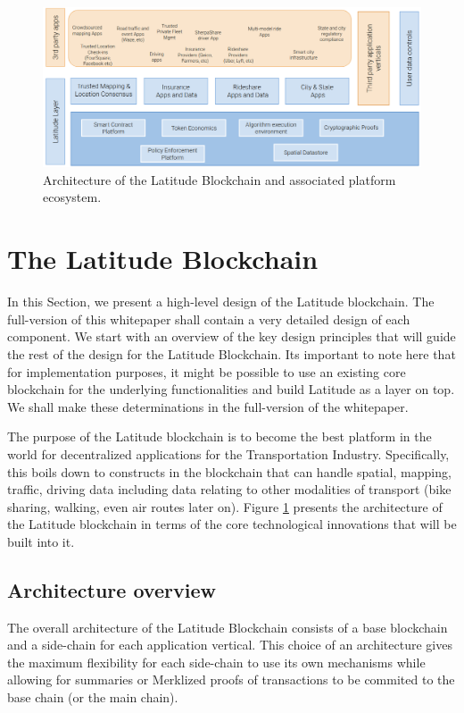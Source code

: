 \begin{figure}[t]
    \centering
    \includegraphics[width=1.00\textwidth]{latarch.png}
  \caption{Architecture of the Latitude Blockchain and associated platform ecosystem.}
    \label{fig:lat-arch}
\end{figure}

\section{The Latitude Blockchain}\label{sec:design}

In this Section, we present a high-level design of the Latitude blockchain. The full-version of this whitepaper shall
contain a very detailed design of each component. We start with an overview of the key design principles that will guide
the rest of the design for the Latitude Blockchain. Its important to note here that for implementation purposes, it
might be possible to use an existing core blockchain for the underlying functionalities and build Latitude as a layer on
top. We shall make these determinations in the full-version of the whitepaper.

The purpose of the Latitude blockchain is to become the best platform in the world for decentralized applications for
the Transportation Industry. Specifically, this boils down to constructs in the blockchain that can handle spatial,
mapping, traffic, driving data including data relating to other modalities of transport (bike sharing, walking, even air
routes later on). Figure \ref{fig:lat-arch} presents the architecture of the Latitude blockchain in terms of the core
technological innovations that will be built into it.

\subsection{Architecture overview}

The overall architecture of the Latitude Blockchain consists of a base blockchain and a side-chain for each application
vertical. This choice of an architecture gives the maximum flexibility for each side-chain to use its own mechanisms
while allowing for summaries or Merklized proofs of transactions to be commited to the base chain (or the main chain).


